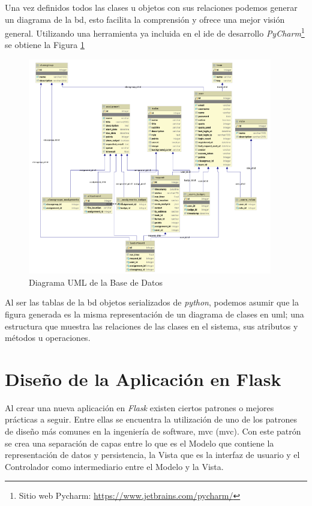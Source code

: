 \documentclass[11pt,spanish,listoffigures,listoftables]{tfgetsinf}
\begin{document}
Una vez definidos todos las clases u objetos con sus relaciones podemos generar un diagrama de la \Gls{bd}, esto facilita la comprensión y ofrece una mejor visión general. Utilizando una herramienta ya incluida en el \acrshort{ide} de desarrollo \textit{PyCharm}\footnote{Sitio web Pycharm: \url{https://www.jetbrains.com/pycharm/}} se obtiene la Figura \ref{figura:database-uml-diagram}

\begin{figure}[!ht]
	\centering
	\includegraphics[width=0.95\textwidth]{img/database-uml-diagram}
	\caption[Diagrama UML de la Base de Datos]{Diagrama UML de la Base de Datos}
	\label{figura:database-uml-diagram}
\end{figure}

Al ser las tablas de la \acrshort{bd} objetos serializados de \textit{python}, podemos asumir que la figura generada es la misma representación de un diagrama de clases en \acrfull{uml}; una estructura que muestra las relaciones de las clases en el sistema, sus atributos y métodos u operaciones.

\section{Diseño de la Aplicación en Flask}

Al crear una nueva aplicación en \textit{Flask} existen ciertos patrones o mejores prácticas a seguir. Entre ellas se encuentra la utilización de uno de los patrones de diseño más comunes en la ingeniería de software, \acrlong{mvc} (\acrshort{mvc}). Con este patrón se crea una separación de capas entre lo que es el Modelo que contiene la representación de datos y persistencia, la Vista que es la interfaz de usuario y el Controlador como intermediario entre el Modelo y la Vista.
\end{document}

